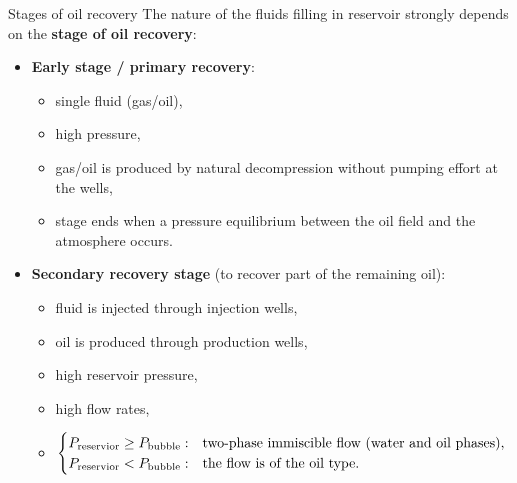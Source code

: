 \begin{frame}{Stages of oil recovery}
	The nature of the fluids filling in reservoir strongly depends on the \alert{\bf stage of oil recovery}:
	\begin{itemize}
		\item {\bf Early stage / primary recovery}: 
		\begin{itemize}
			\item single fluid (gas/oil), 
			\item high pressure,
			\item gas/oil is produced by natural decompression without 
			pumping effort at the wells, 
			\item stage ends when a pressure equilibrium between the oil field and the atmosphere occurs.
		\end{itemize}
		\item {\bf Secondary recovery stage} (to recover part of the remaining oil): 
		\begin{itemize}
			\item fluid is injected through injection wells,
			\item oil is produced through production wells,
			\item high reservoir pressure,
			\item high flow rates,
			\item 
			$
			\begin{cases}
			P_{\rm reservior} \geq P_{\rm bubble}: & 
			\text{two-phase immiscible flow (water and oil phases),} \\
			P_{\rm reservior} < P_{\rm bubble}: & 	
			\text{the flow is of the oil type.} \\
			\end{cases}
			$			
		\end{itemize}
	\end{itemize}
\end{frame}
%
%
